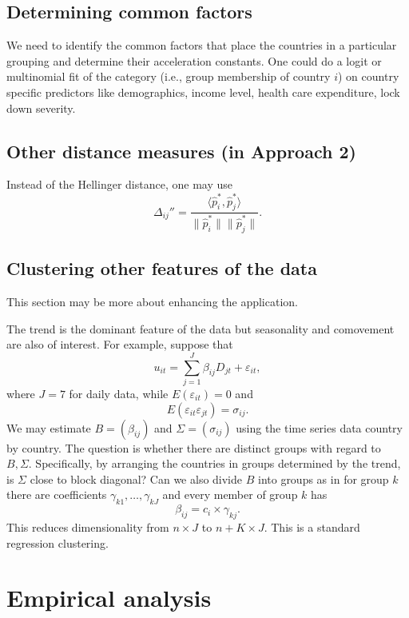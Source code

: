 \documentclass[a4paper,12pt]{article}
\numberwithin{equation}{section}
\begin{document}
\subsection{Determining common factors}

We need to identify the common factors that place the countries in a particular grouping and determine their acceleration constants. One could do a logit or multinomial fit of the category (i.e., group membership of country $i$) on country specific predictors like demographics, income level, health care expenditure, lock down severity.


\subsection{Other distance measures (in Approach 2)}

Instead of the Hellinger distance, one may use 
\[ \Delta_{ij}'' = \frac{\langle \hat{p}_i^*, \hat{p}_j^* \rangle}{\| \hat{p}_i^* \|  \| \hat{p}_j^* \|}. \] 


\subsection{Clustering other features of the data}

This section may be more about enhancing the application. 

The trend is the dominant feature of the data but seasonality and comovement
are also of interest. For example, suppose that 
\[
u_{it}=\sum_{j=1}^{J}\beta _{ij}D_{jt}+\varepsilon _{it},
\]%
where $J=7$ for daily data, while $E(\varepsilon _{it})=0$ and 
\[
E(\varepsilon _{it}\varepsilon _{jt})=\sigma _{ij}.
\]%
We may estimate $B=(\beta _{ij})$ and $\Sigma =(\sigma _{ij})$ using the
time series data country by country. The question is whether there are
distinct groups with regard to $B,\Sigma .$ Specifically, by arranging the
countries in groups determined by the trend, is $\Sigma $ close to block
diagonal? Can we also divide $B$ into groups as in for group $k$ there are
coefficients $\gamma _{k1},\ldots ,\gamma _{kJ}$ and every member of group $k$ has 
\[
\beta _{ij}=c_{i}\times \gamma _{kj}.
\]%
This reduces dimensionality from $n\times J$ to $n+K\times J.$ This is a
standard regression clustering.



\newpage
\section{Empirical analysis}\label{sec:app}
\end{document}
